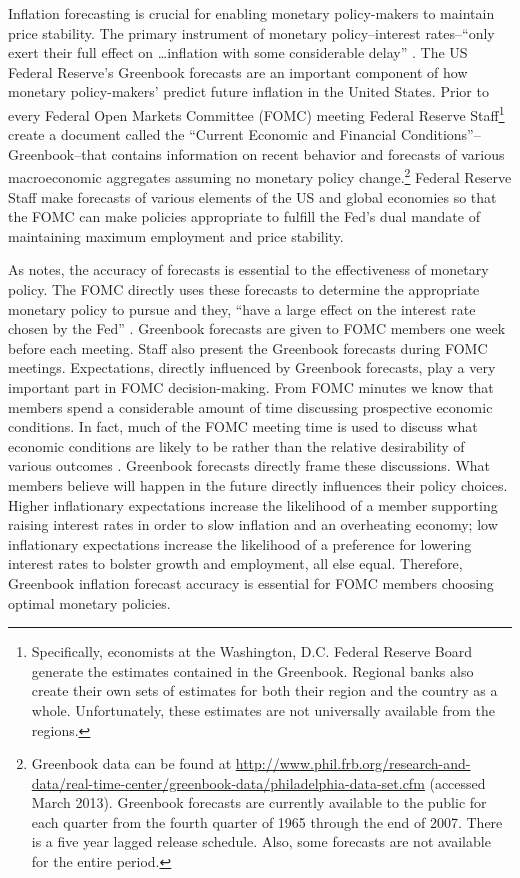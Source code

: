\documentclass[a4paper]{article}
\begin{document}
Inflation forecasting is crucial for enabling monetary policy-makers to maintain price stability. The primary instrument of monetary policy--interest rates--``only exert their full effect on \ldots inflation with some considerable delay'' \citep[59]{Goodhart2001}. The US Federal Reserve's Greenbook forecasts are an important component of how monetary policy-makers' predict future inflation in the United States. Prior to every Federal Open Markets Committee (FOMC) meeting Federal Reserve Staff\footnote{Specifically, economists at the Washington, D.C. Federal Reserve Board generate the estimates contained in the Greenbook. Regional banks also create their own sets of estimates for both their region and the country as a whole. Unfortunately, these estimates are not universally available from the regions.} create a document called the ``Current Economic and Financial Conditions''--Greenbook--that contains information on recent behavior and forecasts of various macroeconomic aggregates assuming no monetary policy change.\footnote{Greenbook data can be found at {\url{http://www.phil.frb.org/research-and-data/real-time-center/greenbook-data/philadelphia-data-set.cfm}} (accessed March 2013). Greenbook forecasts are currently available to the public for each quarter from the fourth quarter of 1965 through the end of 2007. There is a five year lagged release schedule. Also, some forecasts are not available for the entire period.} Federal Reserve Staff make forecasts of various elements of the US and global economies so that the FOMC can make policies appropriate to fulfill the Fed's dual mandate of maintaining maximum employment and price stability. 

As \cite{Svensson2005} notes, the accuracy of forecasts is essential to the effectiveness of monetary policy. The FOMC directly uses these forecasts to determine the appropriate monetary policy to pursue and they, ``have a large effect on the interest rate chosen by the Fed'' \citep[130]{Adolph2013}. Greenbook forecasts are given to FOMC members one week before each meeting. Staff also present the Greenbook forecasts during FOMC meetings. Expectations, directly influenced by Greenbook forecasts, play a very important part in FOMC decision-making. From FOMC minutes we know that members spend a considerable amount of time discussing prospective economic conditions. In fact, much of the FOMC meeting time is used to discuss what economic conditions are likely to be rather than the relative desirability of various outcomes \citep[230]{RomerRomer2008}. Greenbook forecasts directly frame these discussions. What members believe will happen in the future directly influences their policy choices. Higher inflationary expectations increase the likelihood of a member supporting raising interest rates in order to slow inflation and an overheating economy; low inflationary expectations increase the likelihood of a preference for lowering interest rates to bolster growth and employment, all else equal. Therefore, Greenbook inflation forecast accuracy is essential for FOMC members choosing optimal monetary policies.
\end{document}
